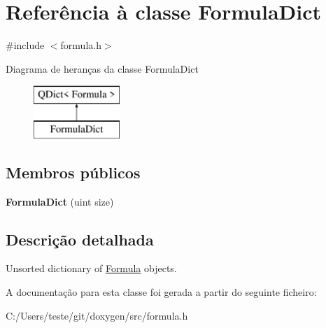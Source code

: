 \hypertarget{class_formula_dict}{\section{Referência à classe Formula\-Dict}
\label{class_formula_dict}
}


{\ttfamily \#include $<$formula.\-h$>$}

Diagrama de heranças da classe Formula\-Dict\begin{figure}[H]
\begin{center}
\leavevmode
\includegraphics[height=2.000000cm]{class_formula_dict}
\end{center}
\end{figure}
\subsection*{Membros públicos}
\begin{DoxyCompactItemize}
\item 
\hypertarget{class_formula_dict_a48f22d61a94a5af7dde4b3af9289624e}{{\bfseries Formula\-Dict} (uint size)}\label{class_formula_dict_a48f22d61a94a5af7dde4b3af9289624e}

\end{DoxyCompactItemize}


\subsection{Descrição detalhada}
Unsorted dictionary of \hyperlink{class_formula}{Formula} objects. 

A documentação para esta classe foi gerada a partir do seguinte ficheiro\-:\begin{DoxyCompactItemize}
\item 
C\-:/\-Users/teste/git/doxygen/src/formula.\-h\end{DoxyCompactItemize}
